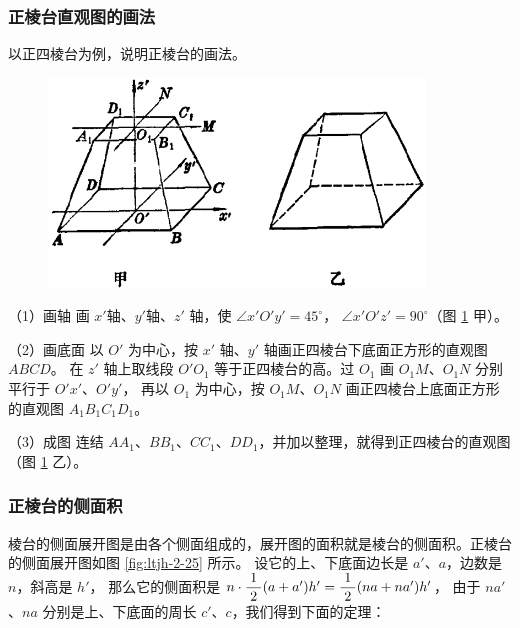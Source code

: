 \begin{enhancedline}
\begin{lianxi}

\end{lianxi}



\subsubsection{正棱台直观图的画法}

以正四棱台为例，说明正棱台的画法。

\begin{figure}[htbp]
    \centering
    \includegraphics[width=10cm]{../pic/ltjh-ch2-24.png}
    \caption{}\label{fig:ltjh-2-24}
\end{figure}

\huafa （1）画轴 \quad 画 $x'$轴、$y'$轴、$z'$ 轴，使 $\angle x'O'y' = 45^\circ$， $\angle x'O'z' = 90^\circ$（图 \ref{fig:ltjh-2-24} 甲）。

（2）画底面 \quad 以 $O'$ 为中心，按 $x'$ 轴、$y'$ 轴画正四棱台下底面正方形的直观图 $ABCD$。
在 $z'$ 轴上取线段 $O'O_1$ 等于正四棱台的高。过 $O_1$ 画 $O_1M$、$O_1N$ 分别平行于 $O'x'$、$O'y'$，
再以 $O_1$ 为中心，按 $O_1M$、$O_1N$ 画正四棱台上底面正方形的直观图 $A_1B_1C_1D_1$。

（3）成图 \quad 连结 $AA_1$、$BB_1$、$CC_1$、$DD_1$，并加以整理，就得到正四棱台的直观图（图 \ref{fig:ltjh-2-24} 乙）。



\subsubsection{正棱台的侧面积}

棱台的侧面展开图是由各个侧面组成的，展开图的面积就是棱台的侧面积。正棱台的侧面展开图如图 \ref{fig:ltjh-2-25} 所示。
设它的上、下底面边长是 $a'$、$a$，边数是 $n$，斜高是 $h'$，
那么它的侧面积是 $n \cdot \dfrac{\; 1 \;}{2} (a + a') h' = \dfrac{\; 1 \;}{2} (na + na') h'$，
由于 $na'$、$na$ 分别是上、下底面的周长 $c'$、$c$，我们得到下面的定理：


\end{enhancedline}
